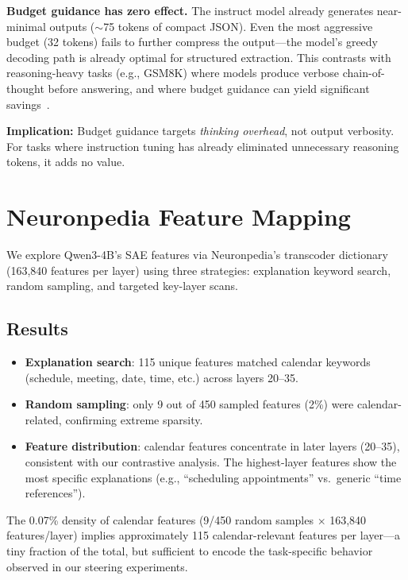 \documentclass[11pt,a4paper]{article}
\begin{document}
\textbf{Budget guidance has zero effect.} The instruct model already generates near-minimal outputs ($\sim$75 tokens of compact JSON). Even the most aggressive budget (32 tokens) fails to further compress the output---the model's greedy decoding path is already optimal for structured extraction. This contrasts with reasoning-heavy tasks (e.g., GSM8K) where models produce verbose chain-of-thought before answering, and where budget guidance can yield significant savings~\cite{li2025budget}.

\textbf{Implication:} Budget guidance targets \textit{thinking overhead}, not output verbosity. For tasks where instruction tuning has already eliminated unnecessary reasoning tokens, it adds no value.

\section{Neuronpedia Feature Mapping}
\label{sec:neuronpedia}

We explore Qwen3-4B's SAE features via Neuronpedia's transcoder dictionary (163,840 features per layer) using three strategies: explanation keyword search, random sampling, and targeted key-layer scans.

\subsection{Results}

\begin{itemize}
    \item \textbf{Explanation search}: 115 unique features matched calendar keywords (schedule, meeting, date, time, etc.) across layers 20--35.
    \item \textbf{Random sampling}: only 9 out of 450 sampled features (2\%) were calendar-related, confirming extreme sparsity.
    \item \textbf{Feature distribution}: calendar features concentrate in later layers (20--35), consistent with our contrastive analysis. The highest-layer features show the most specific explanations (e.g., ``scheduling appointments'' vs.\ generic ``time references'').
\end{itemize}

The 0.07\% density of calendar features (9/450 random samples $\times$ 163,840 features/layer) implies approximately 115 calendar-relevant features per layer---a tiny fraction of the total, but sufficient to encode the task-specific behavior observed in our steering experiments.
\end{document}
